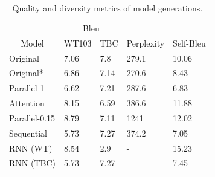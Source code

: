 \documentclass[10pt,twocolumn,letterpaper]{article}
\begin{document}
\begin{table}[]
\begin{tabular}{lllll}
\hline
\multicolumn{1}{c}{} & \multicolumn{2}{c}{Bleu} & \multicolumn{1}{c}{\multirow{}{}{}} & \multicolumn{1}{c}{} \\ \cline{2-3}
\multicolumn{1}{c}{\multirow{}{}{Model}}   & WT103       & TBC        & \multicolumn{1}{c}{\multirow{}{}{Perplexity}} & Self-Bleu  \\ \hline
Original \cite{wang2019bert}                & 7.06        & 7.8        & 279.1        & 10.06                                            \\
Original*                            & 6.86        & 7.14        & 270.6             & 8.43                                  \\
Parallel-1                                 & 6.62        & 7.21       & 287.6                    & 6.83                           \\
Attention                                 & 8.15        & 6.59       & 386.6                  &  11.88                          \\
Parallel-0.15                              & 8.79            & 7.11           & 1241         & 12.02                                       \\
Sequential                                & 5.73            & 7.27           & 374.2          & 7.05                                      \\
RNN (WT)                                & 8.54            & 2.9           & -                  & 15.23                              \\
RNN (TBC)                                & 5.73            & 7.27           & -                & 7.45                                \\ \hline
\end{tabular}
\caption{Quality and diversity metrics of model generations.}
\label{tab:results}
\end{table}
\end{document}
